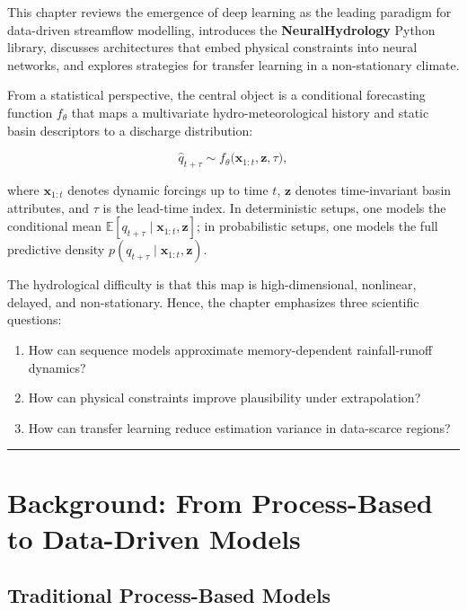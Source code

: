 \documentclass[
]{krantz}
\providecommand{\tightlist}{%
  \setlength{\itemsep}{0pt}\setlength{\parskip}{0pt}}
\begin{document}
This chapter reviews the emergence of deep learning as the leading paradigm for
data-driven streamflow modelling, introduces the \textbf{NeuralHydrology} Python library,
discusses architectures that embed physical constraints into neural networks, and
explores strategies for transfer learning in a non-stationary climate.

From a statistical perspective, the central object is a conditional forecasting function
\(f_\theta\) that maps a multivariate hydro-meteorological history and static basin
descriptors to a discharge distribution:

\[
\hat{q}_{t+\tau} \sim f_\theta\Big(\mathbf{x}_{1:t}, \mathbf{z}, \tau\Big),
\]

where \(\mathbf{x}_{1:t}\) denotes dynamic forcings up to time \(t\), \(\mathbf{z}\) denotes
time-invariant basin attributes, and \(\tau\) is the lead-time index. In deterministic
setups, one models the conditional mean \(\mathbb{E}[q_{t+\tau}\mid\mathbf{x}_{1:t},\mathbf{z}]\);
in probabilistic setups, one models the full predictive density
\(p(q_{t+\tau}\mid\mathbf{x}_{1:t},\mathbf{z})\).

The hydrological difficulty is that this map is high-dimensional, nonlinear, delayed,
and non-stationary. Hence, the chapter emphasizes three scientific questions:

\begin{enumerate}
\def\labelenumi{\arabic{enumi}.}
\tightlist
\item
  How can sequence models approximate memory-dependent rainfall-runoff dynamics?
\item
  How can physical constraints improve plausibility under extrapolation?
\item
  How can transfer learning reduce estimation variance in data-scarce regions?
\end{enumerate}

\begin{center}\rule{0.5\linewidth}{0.5pt}\end{center}

\section{Background: From Process-Based to Data-Driven Models}\label{nh-background}

\subsection{Traditional Process-Based Models}\label{traditional-process-based-models}
\end{document}
